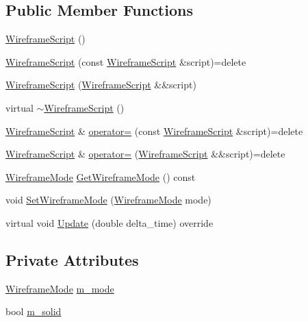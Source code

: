 \subsection*{Public Member Functions}
\begin{DoxyCompactItemize}
\item 
\hyperlink{classmage_1_1_wireframe_script_a3dc73b04bdab31e19b46360bfe5f4766}{Wireframe\+Script} ()
\item 
\hyperlink{classmage_1_1_wireframe_script_abd35f16fba0de4d370728e832d757473}{Wireframe\+Script} (const \hyperlink{classmage_1_1_wireframe_script}{Wireframe\+Script} \&script)=delete
\item 
\hyperlink{classmage_1_1_wireframe_script_a465b1b144af8376b2f9afdd11c51af98}{Wireframe\+Script} (\hyperlink{classmage_1_1_wireframe_script}{Wireframe\+Script} \&\&script)
\item 
virtual \hyperlink{classmage_1_1_wireframe_script_abbb814f01dce03195e83b24bf244757f}{$\sim$\+Wireframe\+Script} ()
\item 
\hyperlink{classmage_1_1_wireframe_script}{Wireframe\+Script} \& \hyperlink{classmage_1_1_wireframe_script_a0382415dade9f889b1edebf2ee5aa770}{operator=} (const \hyperlink{classmage_1_1_wireframe_script}{Wireframe\+Script} \&script)=delete
\item 
\hyperlink{classmage_1_1_wireframe_script}{Wireframe\+Script} \& \hyperlink{classmage_1_1_wireframe_script_a6be79bd5b62f7cf6e9d1237dba0a5bdc}{operator=} (\hyperlink{classmage_1_1_wireframe_script}{Wireframe\+Script} \&\&script)=delete
\item 
\hyperlink{classmage_1_1_wireframe_script_a99d65e77e89c2581544e68030adcefb7}{Wireframe\+Mode} \hyperlink{classmage_1_1_wireframe_script_a1f9553ffde0bfd70ee55ce653fa06dd7}{Get\+Wireframe\+Mode} () const
\item 
void \hyperlink{classmage_1_1_wireframe_script_a0905da00e545cc219c479fe5a89b5a7f}{Set\+Wireframe\+Mode} (\hyperlink{classmage_1_1_wireframe_script_a99d65e77e89c2581544e68030adcefb7}{Wireframe\+Mode} mode)
\item 
virtual void \hyperlink{classmage_1_1_wireframe_script_af077736607ad22f66d8553066af51760}{Update} (double delta\+\_\+time) override
\end{DoxyCompactItemize}
\subsection*{Private Attributes}
\begin{DoxyCompactItemize}
\item 
\hyperlink{classmage_1_1_wireframe_script_a99d65e77e89c2581544e68030adcefb7}{Wireframe\+Mode} \hyperlink{classmage_1_1_wireframe_script_a93de9a9a8bac873b63e7529df3327ef1}{m\+\_\+mode}
\item 
bool \hyperlink{classmage_1_1_wireframe_script_a5e038a5e1615ab9323132a3e0a228a82}{m\+\_\+solid}
\end{DoxyCompactItemize}
